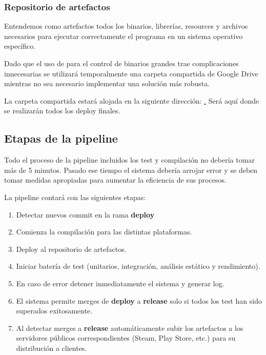 \subsubsection{Repositorio de artefactos}\label{pipeline:repositorio-de-artefactos}

Entendemos como artefactos todos los binarios, librerías, resources y archivos necesarios para ejecutar correctamente el programa en un sistema operativo específico.

Dado que el uso de  para el control de binarios grandes trae complicaciones innecesarias se utilizará temporalmente una carpeta compartida de Google Drive mientras no sea necesario implementar una solución más robusta.

La carpeta compartida estará alojada en la siguiente dirección: \href{https://drive.google.com/drive/folders/15OtN9fs-UASOKTRcWGbR-knWMSmQGyO_?usp=sharing}. Será aquí donde se realizarán todos los deploy finales.

\subsection{Etapas de la pipeline}\label{pipeline:etapas-pipeline}

Todo el proceso de la pipeline incluidos los test y compilación no debería tomar más de 5 minutos. Pasado ese tiempo el sistema debería arrojar error y se deben tomar medidas apropiadas para aumentar la eficiencia de sus procesos.

La pipeline contará con las siguientes etapas:

\begin{enumerate}
    \item Detectar nuevos commit en la rama \textbf{deploy}
    \item Comienza la compilación para las distintas plataformas.
    \item Deploy al repositorio de artefactos.
    \item Iniciar batería de test (unitarios, integración, análisis estático y rendimiento).
    \item En caso de error detener inmediatamente el sistema y generar log.
    \item El sistema permite merges de \textbf{deploy} a \textbf{release} solo si todos los test han sido superados exitosamente.
    \item Al detectar merges a \textbf{release} automáticamente subir los artefactos a los servidores públicos correspondientes (Steam, Play Store, etc.) para su distribución a clientes.
\end{enumerate}

